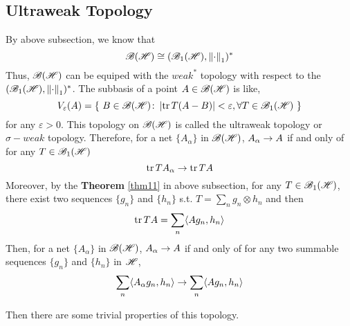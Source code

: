 \documentclass[a4paper,11pt]{report}
\begin{document}
\subsection{Ultraweak Topology}

By above subsection, we know that
\begin{equation*}
	\mathscr{B(H)} \cong (\mathscr{B}_{1}\mathscr{(H)}, \left\lVert\cdot\right\lVert_1)^{*}
\end{equation*}
Thus, $\mathscr{B(H)}$ can be equiped with the $weak^{*}$ topology with respect to the $(\mathscr{B}_{1}\mathscr{(H)}, \left\lVert\cdot\right\lVert_1)^{*}$. The subbasis of a point $A \in \mathscr{B(H)}$ is like,
\begin{equation*}
	V_{\varepsilon}(A) = \{~B \in \mathscr{B(H)} \colon \left\lvert\operatorname{tr}{T(A-B)}\right\lvert < \varepsilon, \forall T \in \mathscr{B}_{1}\mathscr{(H)}~\}
\end{equation*}
for any $\varepsilon > 0$. This topology on $\mathscr{B(H)}$ is called the ultraweak topology or $\sigma-weak$ topology. Therefore, for a net $\{A_{\alpha}\}$ in $\mathscr{B(H)}$, $A_{\alpha} \rightarrow A$ if and only of for any $T \in \mathscr{B}_{1}\mathscr{(H)}$
\begin{equation*}
	\operatorname{tr}{TA_{\alpha}} \rightarrow \operatorname{tr}{TA}
\end{equation*}
Moreover, by the \textbf{Theorem} \ref{thm11} in above subsection, for any $T \in \mathscr{B}_{1}\mathscr{(H)}$, there exist two sequences $\{g_n\}$ and $\{h_n\}$ s.t. $T = \sum_n g_n \otimes h_n$ and then
\begin{equation*}
	\operatorname{tr}{TA} = \sum_n \langle A g_n, h_n \rangle
\end{equation*}
Then, for a net $\{A_{\alpha}\}$ in $\mathscr{B(H)}$, $A_{\alpha} \rightarrow A$ if and only of for any two summable sequences $\{g_n\}$ and $\{h_n\}$ in $\mathscr{H}$, 
\begin{equation*}
	\sum_n \langle A_{\alpha} g_n, h_n \rangle \rightarrow \sum_n \langle A g_n, h_n \rangle
\end{equation*}

Then there are some trivial properties of this topology.
\end{document}
